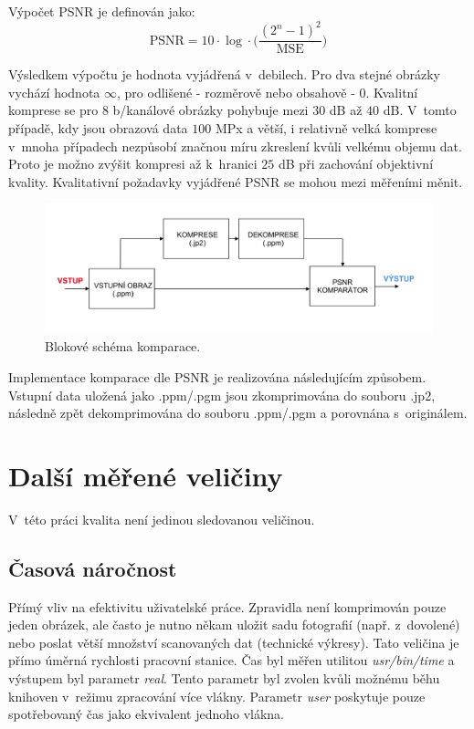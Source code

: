 \noindent Výpočet PSNR je definován jako:
\begin{equation}
  \text{PSNR} = 10 \cdot \log \cdot \bigg(\frac{(2^n-1)^2}{\text{MSE}}\bigg)
  \label{eq:psnr}
\end{equation}

\newpage
\noindent Výsledkem výpočtu je hodnota vyjádřená v~debilech. Pro dva stejné obrázky vychází hodnota $\infty$, pro odlišené - rozměrově nebo obsahově - $0$. Kvalitní komprese se pro $8$ b/kanálové obrázky pohybuje mezi $30$ dB až $40$ dB. V~tomto případě, kdy jsou obrazová data $100$ MPx a větší, i relativně velká komprese v~mnoha případech nezpůsobí značnou míru zkreslení kvůli velkému objemu dat. Proto je možno zvýšit kompresi až k~hranici $25$ dB při zachování objektivní kvality. Kvalitativní požadavky vyjádřené PSNR se mohou mezi měřeními měnit.

\begin{figure}[hbt!]
  \centering
  \includegraphics[width=16cm]{obrazky-figures/komparace.pdf}
  \caption{Blokové schéma komparace.}
  \label{retezec}
\end{figure}

\noindent Implementace komparace dle PSNR je realizována následujícím způsobem. Vstupní data uložená jako .ppm/.pgm jsou zkomprimována do souboru .jp2, následně zpět dekomprimována do souboru .ppm/.pgm a porovnána s~originálem.

\section{Další měřené veličiny}
V~této práci kvalita není jedinou sledovanou veličinou.
\subsection*{Časová náročnost}
Přímý vliv na efektivitu uživatelské práce. Zpravidla není komprimován pouze jeden obrázek, ale často je nutno někam uložit sadu fotografií (např. z~dovolené) nebo poslat větší množství scanovaných dat (technické výkresy). Tato veličina je přímo úměrná rychlosti pracovní stanice. Čas byl měřen utilitou \textit{usr/bin/time} a výstupem byl parametr \textit{real}. Tento parametr byl zvolen kvůli možnému běhu knihoven v~režimu zpracování více vlákny. Parametr \textit{user} poskytuje pouze spotřebovaný čas jako ekvivalent jednoho vlákna.

